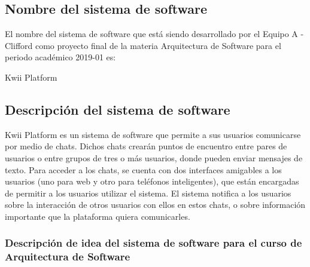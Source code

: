 \subsection{Nombre del sistema de software}

El nombre del sistema de software que está siendo desarrollado por el Equipo A - Clifford como proyecto final de la materia Arquitectura de Software para el periodo académico 2019-01 es:
\begin{center}
    Kwii Platform
\end{center}

\subsection{Descripción del sistema de software}

Kwii Platform es un sistema de software que permite a sus usuarios comunicarse por medio de chats. Dichos chats crearán puntos de encuentro entre pares de usuarios o entre grupos de tres o más usuarios, donde pueden enviar mensajes de texto. Para acceder a los chats, se cuenta con dos interfaces amigables a los usuarios (uno para web y otro para teléfonos inteligentes), que están encargadas de permitir a los usuarios utilizar el sistema. El sistema notifica a los usuarios sobre la interacción de otros usuarios con ellos en estos chats, o sobre información importante que la plataforma quiera comunicarles.

\subsubsection{Descripción de idea del sistema de software para el curso de Arquitectura de Software}

